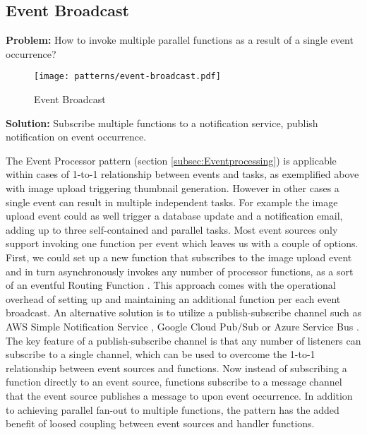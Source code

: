 \subsection{Event Broadcast} \label{subsec:EventBroadcast}

\textbf{Problem:} How to invoke multiple parallel functions as a result of a single event occurrence?

\begin{figure}[h]
  \centering
  \texttt{[image: patterns/event-broadcast.pdf]}
  \caption{Event Broadcast}
  \label{fig:eventBroadcast}
\end{figure}

\textbf{Solution:} Subscribe multiple functions to a notification service, publish notification on event occurrence.

The Event Processor pattern (section \ref{subsec:Eventprocessing}) is applicable within cases of 1-to-1 relationship between events and tasks, as exemplified above with image upload triggering thumbnail generation. However in other cases a single event can result in multiple independent tasks. For example the image upload event could as well trigger a database update and a notification email, adding up to three self-contained and parallel tasks. Most event sources only support invoking one function per event which leaves us with a couple of options. First, we could set up a new function that subscribes to the image upload event and in turn asynchronously invokes any number of processor functions, as a sort of an eventful Routing Function \label{subsec:routingFunction}. This approach comes with the operational overhead of setting up and maintaining an additional function per each event broadcast. An alternative solution is to utilize a publish-subscribe channel such as AWS Simple Notification Service \parencite{awslambda0218}, Google Cloud Pub/Sub \parencite{google18cloudFunctions} or Azure Service Bus \parencite{microsoft18azureFunctions}. The key feature of a publish-subscribe channel is that any number of listeners can subscribe to a single channel, which can be used to overcome the 1-to-1 relationship between event sources and functions. Now instead of subscribing a function directly to an event source, functions subscribe to a message channel that the event source publishes a message to upon event occurrence. In addition to achieving parallel fan-out to multiple functions, the pattern has the added benefit of loosed coupling between event sources and handler functions. \parencite{sbarski2017serverless}

